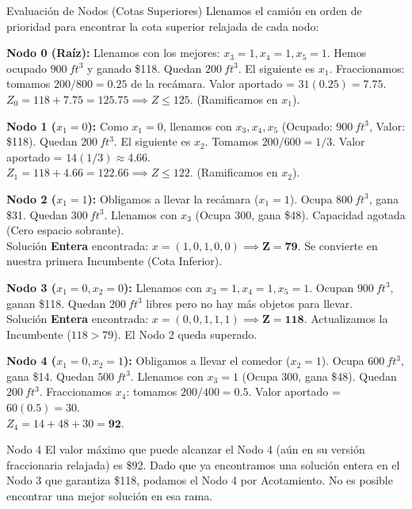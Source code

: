 \documentclass[10pt,a4paper]{article}
\begin{document}
\begin{nota}{Evaluación de Nodos (Cotas Superiores)}
Llenamos el camión en orden de prioridad para encontrar la cota superior relajada de cada nodo:

\textbf{Nodo 0 (Raíz):} Llenamos con los mejores: $x_3=1, x_4=1, x_5=1$. Hemos ocupado $900 \ ft^3$ y ganado \$118. Quedan $200 \ ft^3$. El siguiente es $x_1$. Fraccionamos: tomamos $200/800 = 0.25$ de la recámara. Valor aportado = $31(0.25) = 7.75$. \\
$Z_0 = 118 + 7.75 = \mathbf{125.75} \implies Z \leq 125$. (Ramificamos en $x_1$).

\textbf{Nodo 1 ($x_1 = 0$):} Como $x_1=0$, llenamos con $x_3, x_4, x_5$ (Ocupado: $900 \ ft^3$, Valor: \$118). Quedan $200 \ ft^3$. El siguiente es $x_2$. Tomamos $200/600 = 1/3$. Valor aportado = $14(1/3) \approx 4.66$. \\
$Z_1 = 118 + 4.66 = \mathbf{122.66} \implies Z \leq 122$. (Ramificamos en $x_2$).

\textbf{Nodo 2 ($x_1 = 1$):} Obligamos a llevar la recámara ($x_1=1$). Ocupa $800 \ ft^3$, gana \$31. Quedan $300 \ ft^3$. Llenamos con $x_3$ (Ocupa 300, gana \$48). Capacidad agotada (Cero espacio sobrante). \\
Solución \textbf{Entera} encontrada: $x=(1,0,1,0,0) \implies \mathbf{Z = 79}$. Se convierte en nuestra primera Incumbente (Cota Inferior).

\textbf{Nodo 3 ($x_1 = 0, x_2 = 0$):} Llenamos con $x_3=1, x_4=1, x_5=1$. Ocupan $900 \ ft^3$, ganan \$118. Quedan $200 \ ft^3$ libres pero no hay más objetos para llevar. \\
Solución \textbf{Entera} encontrada: $x=(0,0,1,1,1) \implies \mathbf{Z = 118}$. Actualizamos la Incumbente ($118 > 79$). El Nodo 2 queda superado.

\textbf{Nodo 4 ($x_1 = 0, x_2 = 1$):} Obligamos a llevar el comedor ($x_2=1$). Ocupa $600 \ ft^3$, gana \$14. Quedan $500 \ ft^3$. Llenamos con $x_3=1$ (Ocupa 300, gana \$48). Quedan $200 \ ft^3$. Fraccionamos $x_4$: tomamos $200/400 = 0.5$. Valor aportado = $60(0.5) = 30$. \\
$Z_4 = 14 + 48 + 30 = \mathbf{92}$. 
\end{nota}

\begin{alerta}{Nodo 4}
El valor máximo que puede alcanzar el Nodo 4 (aún en su versión fraccionaria relajada) es \$92. Dado que ya encontramos una solución entera en el Nodo 3 que garantiza \$118, podamos el Nodo 4 por Acotamiento. No es posible encontrar una mejor solución en esa rama.
\end{alerta}
\end{document}

